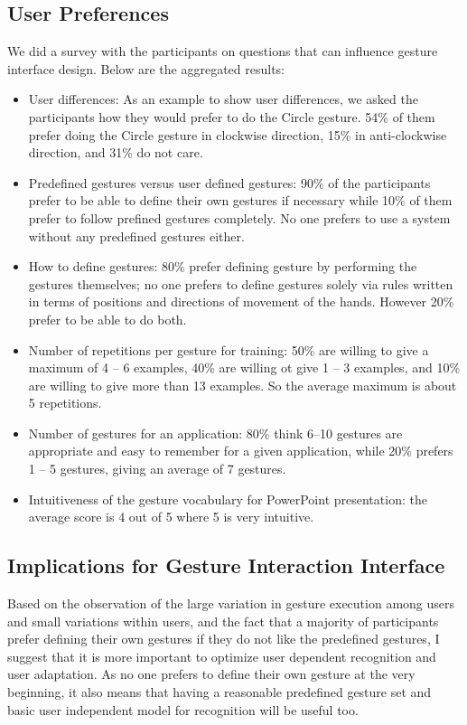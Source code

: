 \subsection{User Preferences}\label{sec:preferences}
We did a survey with the participants on questions that can influence
gesture interface design. Below are the aggregated results:
\begin{itemize}
  \item User differences: As an example to show user differences, we asked
  the participants how they would prefer to do the Circle gesture. 54\%
  of them prefer doing the Circle gesture in clockwise direction, 15\% in
  anti-clockwise direction, and 31\% do not care.
  \item Predefined gestures versus user defined gestures: 90\%
  of the participants prefer to be able to define their own gestures if necessary while 10\% of them prefer to follow prefined
  gestures completely. No one prefers to use a system without any predefined
  gestures either.
  \item How to define gestures: 80\% prefer defining gesture by 
  performing the gestures themselves; no one prefers to
  define gestures solely via rules written in terms of positions and directions
  of movement of the hands.
  However 20\% prefer to be able to do both.
  \item Number of repetitions per gesture for training: 50\% are willing to give a
  maximum of 4 -- 6 examples, 40\% are willing ot give 1 -- 3 examples, and 10\%
  are willing to give more than 13 examples. So the average maximum is about 5
  repetitions.
  \item Number of gestures for an application: 80\% think 6--10 gestures are
  appropriate and easy to remember for a given application, while 20\% prefers 1
  -- 5 gestures, giving an average of 7 gestures.
  \item Intuitiveness of the gesture vocabulary for PowerPoint presentation:
  the average score is 4 out of 5 where 5 is very intuitive.
\end{itemize}

\subsection{Implications for Gesture Interaction Interface}
Based on the observation of the large variation in gesture execution among
users and small variations within users, and the fact that a majority of
participants prefer defining their own gestures if they do not like the
predefined gestures, I suggest that it is more important to optimize user
dependent recognition and user adaptation. As no one prefers to define their own
gesture at the very beginning, it also means that having a reasonable predefined gesture set and
basic user independent model for recognition will be useful too.

